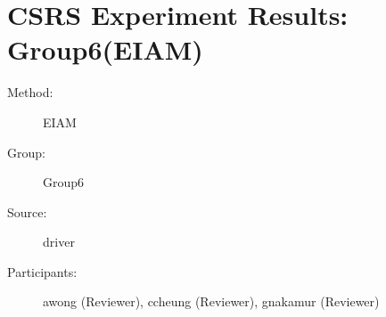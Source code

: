 \chapter {CSRS Experiment Results: Group6(EIAM)}	  
\small
	  

\begin{description}
\item [Method:] EIAM
\item [Group:] Group6
\item [Source:] driver
\item [Participants:] awong (Reviewer), ccheung (Reviewer), gnakamur (Reviewer)
\end{description}
